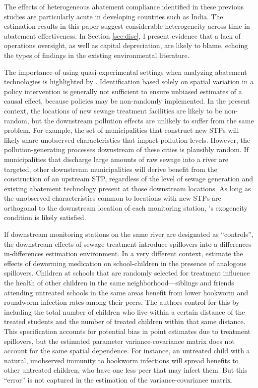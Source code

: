 \documentclass[12pt]{article}
\renewcommand{\citet}[1]{\citeauthor{#1} \citeyearpar{#1}}
\newcommand{\did}{differences-in-differences }
\begin{document}
The effects of heterogeneous abatement compliance identified in these previous studies are particularly acute in developing countries such as India. The estimation results in this paper suggest considerable heterogeneity across time in abatement effectiveness. In Section \ref{sec:disc}, I present evidence that a lack of operations oversight, as well as capital depreciation, are likely to blame, echoing the types of findings in the existing environmental literature. 

The importance of using quasi-experimental settings when analyzing abatement technologies is highlighted by \citet{dominici2014}. Identification based solely on spatial variation in a policy intervention is generally not sufficient to ensure unbiased estimates of a causal effect, because policies may be non-randomly implemented. In the present context, the locations of new sewage treatment facilities are likely to be non-random, but the downstream pollution effects are unlikely to suffer from the same problem. For example, the set of municipalities that construct new STPs will likely share unobserved characteristics that impact pollution levels. However, the pollution-generating processes downstream of these cities is plausibly random. If municipalities that discharge large amounts of raw sewage into a river are targeted, other downstream municipalities will derive benefit from the construction of an upstream STP, regardless of the level of sewage generation and existing abatement technology present at those downstream locations. As long as the unobserved characteristics common to locations with new STPs are orthogonal to the downstream location of each monitoring station, \citeauthor{dominici2014}'s exogeneity condition is likely satisfied.

If downstream monitoring stations on the same river are designated as ``controls'', the downstream effects of sewage treatment introduce spillovers into a \did estimation environment. In a very different context, \citet{miguel2004} estimate the effects of deworming medication on school-children in the presence of analogous spillovers. Children at schools that are randomly selected for treatment influence the health of other children in the same neighborhood---siblings and friends attending untreated schools in the same areas benefit from lower hookworm and roundworm infection rates among their peers. The authors control for this by including the total number of children who live within a certain distance of the treated students and the number of treated children within that same distance. This specification accounts for potential bias in point estimates due to treatment spillovers, but the estimated parameter variance-covariance matrix does not account for the same spatial dependence. For instance, an untreated child with a natural, unobserved immunity to hookworm infections will spread benefits to other untreated children, who have one less peer that may infect them. But this ``error'' is not captured in the estimation of the variance-covariance matrix.
\end{document}
